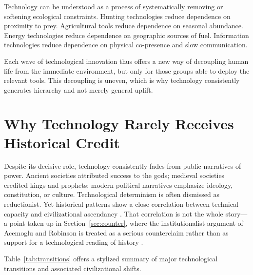 \documentclass[12pt,letterpaper]{article}
\begin{document}
Technology can be understood as a process of systematically removing or softening ecological constraints. Hunting technologies reduce dependence on proximity to prey. Agricultural tools reduce dependence on seasonal abundance. Energy technologies reduce dependence on geographic sources of fuel. Information technologies reduce dependence on physical co-presence and slow communication.

Each wave of technological innovation thus offers a new way of decoupling human life from the immediate environment, but only for those groups able to deploy the relevant tools. This decoupling is uneven, which is why technology consistently generates hierarchy and not merely general uplift.

\section{Why Technology Rarely Receives Historical Credit}
\label{sec:credit}

Despite its decisive role, technology consistently fades from public narratives of power. Ancient societies attributed success to the gods; medieval societies credited kings and prophets; modern political narratives emphasize ideology, constitution, or culture. Technological determinism is often dismissed as reductionist. Yet historical patterns show a close correlation between technical capacity and civilizational ascendancy \cite{diamond1997,pomeranz2000,landes1998}. That correlation is not the whole story---a point taken up in Section~\ref{sec:counter}, where the institutionalist argument of Acemoglu and Robinson is treated as a serious counterclaim rather than as support for a technological reading of history \cite{acemoglu2012}.

Table~\ref{tab:transitions} offers a stylized summary of major technological transitions and associated civilizational shifts.
\end{document}
